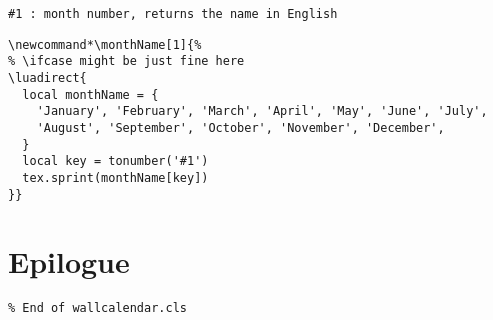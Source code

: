 \documentclass[11pt,oneside]{memoir-article}
\begin{document}
\begin{verbatim}
#1 : month number, returns the name in English
\end{verbatim}

\begin{verbatim}
\newcommand*\monthName[1]{%
% \ifcase might be just fine here
\luadirect{
  local monthName = {
    'January', 'February', 'March', 'April', 'May', 'June', 'July',
    'August', 'September', 'October', 'November', 'December',
  }
  local key = tonumber('#1')
  tex.sprint(monthName[key])
}}
\end{verbatim}

\chapter{Epilogue}
\label{sec:org15e763a}

\begin{verbatim}
% End of wallcalendar.cls
\end{verbatim}
\end{document}
